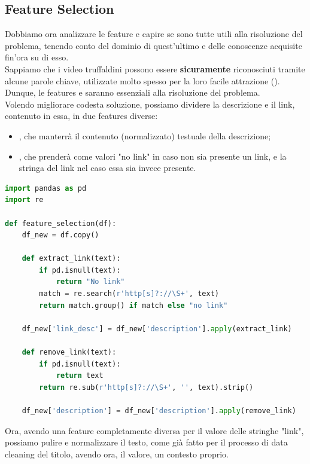 \documentclass[a4paper,12pt]{report}
\begin{document}
\subsection{Feature Selection}
Dobbiamo ora analizzare le feature e capire se sono tutte utili alla risoluzione del problema, tenendo conto del dominio di quest'ultimo e delle conoscenze acquisite fin'ora su di esso.\\
Sappiamo che i video truffaldini possono essere \textbf{sicuramente} riconosciuti tramite alcune parole chiave, utilizzate molto spesso per la loro facile attrazione (\href{https://www.eset.com/sg/about/newsroom/press-releases1/eset-blog/if-its-too-good-to-be-true-it-probably-is/}{\color{blue}{"Se qualcosa è troppo bello per essere vero, allora probabilmente lo è"}}).\\
Dunque, le features \texttt{\color{red}{title}} e \texttt{\color{red}{description}} saranno essenziali alla risoluzione del problema.\\
Volendo migliorare codesta soluzione, possiamo dividere la descrizione e il link, contenuto in essa, in due features diverse:
\begin{itemize}
    \item \texttt{\color{red}{description}}, che manterrà il contenuto (normalizzato) testuale della descrizione;
    \item \texttt{\color{red}{link\_desc}}, che prenderà come valori "no link" in caso non sia presente un link, e la stringa del link nel caso essa sia invece presente.
\end{itemize}
\begin{lstlisting}[language=Python]
import pandas as pd
import re

def feature_selection(df):
    df_new = df.copy()

    def extract_link(text):
        if pd.isnull(text):
            return "No link"
        match = re.search(r'http[s]?://\S+', text)
        return match.group() if match else "no link"

    df_new['link_desc'] = df_new['description'].apply(extract_link)

    def remove_link(text):
        if pd.isnull(text):
            return text
        return re.sub(r'http[s]?://\S+', '', text).strip()

    df_new['description'] = df_new['description'].apply(remove_link)
\end{lstlisting}
Ora, avendo una feature completamente diversa per il valore delle stringhe "link", possiamo pulire e normalizzare il testo, come già fatto per il processo di data cleaning del titolo, avendo ora, il valore, un contesto proprio.
\end{document}
